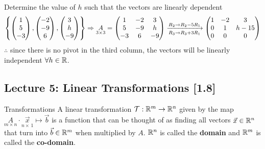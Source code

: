 \begin{example}{}{}
    Determine the value of $h$ such that the vectors are linearly dependent 
    \[
        \left\{
            \begin{pmatrix}
                1 \\ 5 \\ -3
            \end{pmatrix},
            \begin{pmatrix}
                -2 \\ -9 \\ 6
            \end{pmatrix},
            \begin{pmatrix}
                3 \\ h \\ -9
            \end{pmatrix}
         \right\} \Rightarrow
        \underset{3 \times 3}{A} = 
        \begin{pmatrix}
            1 & -2 & 3 \\
            5 & -9 & h \\
            -3 & 6 & -9
        \end{pmatrix}
        \xrightarrow[R_3 \to R_3 + 3R_1]{R_2 \to R_2 - 5R_1}
        \begin{pmatrix}
            1 & -2 & 3 \\
            0 & 1 & h-15 \\
            0 & 0 & 0
        \end{pmatrix}
    \]
    $\therefore$ since there is no pivot in the third column, the vectors will be linearly independent $\forall h \in \mathbb R$.
\end{example}

\subsection{Lecture 5: Linear Transformations [1.8]}
\begin{defbox}{Transformations}{}
    A linear transformation $\mathcal{T}: \mathbb R^{m} \to \mathbb R^{n}$ given by the map $\underset{m \times n}{A} \cdot \underset{n\times\,1}{\vec{x}} \mapsto \vec{b}$ is a function that can be thought of as finding all vectors $\vec{x} \in \mathbb R^{n}$ that turn into $\vec{b} \in \mathbb R^{m}$ when multiplied by $A$. $\mathbb R^{n}$ is called the \textbf{domain} and $\mathbb R^{m}$ is called the \textbf{co-domain}.
\end{defbox}

